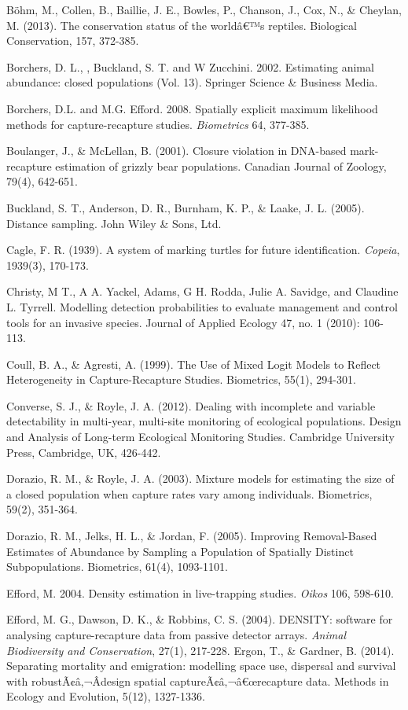 \documentclass{book}
\begin{document}
\rf B{\"o}hm, M., Collen, B., Baillie, J. E., Bowles, P., Chanson, J., Cox, N., \& Cheylan, M. (2013). The conservation status of the worldâ€™s reptiles. Biological Conservation, 157, 372-385.

\rf Borchers, D. L., , Buckland, S. T.  and W Zucchini. 2002. Estimating animal abundance: closed populations (Vol. 13). Springer Science \& Business Media.

\rf Borchers, D.L. and M.G. Efford. 2008. Spatially explicit maximum likelihood methods for capture-recapture studies. {\it Biometrics} 64, 377-385.

\rf Boulanger, J., \& McLellan, B. (2001). Closure violation in DNA-based mark-recapture estimation of grizzly bear populations. Canadian Journal of Zoology, 79(4), 642-651.

\rf Buckland, S. T., Anderson, D. R., Burnham, K. P., \& Laake, J. L. (2005). Distance sampling. John Wiley \& Sons, Ltd.

\rf Cagle, F. R. (1939). A system of marking turtles for future identification. \textit{Copeia}, 1939(3), 170-173.

\rf Christy, M T., A A. Yackel, Adams, G H. Rodda, Julie A. Savidge, and Claudine L. Tyrrell. Modelling detection probabilities to evaluate management and control tools for an invasive species. Journal of Applied Ecology 47, no. 1 (2010): 106-113.

\rf Coull, B. A., \& Agresti, A. (1999). The Use of Mixed Logit Models to Reflect Heterogeneity in Capture-Recapture Studies. Biometrics, 55(1), 294-301.

\rf Converse, S. J., \& Royle, J. A. (2012). Dealing with incomplete and variable detectability in multi-year, multi-site monitoring of ecological populations. Design and Analysis of Long-term Ecological Monitoring Studies. Cambridge University Press, Cambridge, UK, 426-442.

\rf Dorazio, R. M., \& Royle, J. A. (2003). Mixture models for estimating the size of a closed population when capture rates vary among individuals. Biometrics, 59(2), 351-364.

\rf Dorazio, R. M., Jelks, H. L., \& Jordan, F. (2005). Improving Removal-Based Estimates of Abundance by Sampling a Population of Spatially Distinct Subpopulations. Biometrics, 61(4), 1093-1101.

\rf Efford, M. 2004. Density estimation in live-trapping studies. {\it Oikos}  106, 598-610.

\rf Efford, M. G., Dawson, D. K., \& Robbins, C. S. (2004). DENSITY: software for analysing capture-recapture data from passive detector arrays. \textit{Animal Biodiversity and Conservation}, 27(1), 217-228.
\rf Ergon, T., \& Gardner, B. (2014). Separating mortality and emigration: modelling space use, dispersal and survival with robustÃ¢â‚¬Âdesign spatial captureÃ¢â‚¬â€œrecapture data. Methods in Ecology and Evolution, 5(12), 1327-1336.
\end{document}
